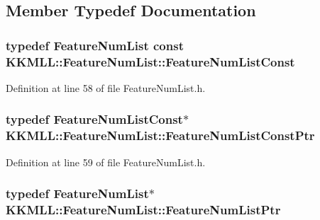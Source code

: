 \subsection{Member Typedef Documentation}
\subsubsection[{\texorpdfstring{Feature\+Num\+List\+Const}{FeatureNumListConst}}]{\setlength{\rightskip}{0pt plus 5cm}typedef {\bf Feature\+Num\+List} const {\bf K\+K\+M\+L\+L\+::\+Feature\+Num\+List\+::\+Feature\+Num\+List\+Const}}\hypertarget{class_k_k_m_l_l_1_1_feature_num_list_a2a39685c8a0cb219f57f9b256c92ed5c}{}\label{class_k_k_m_l_l_1_1_feature_num_list_a2a39685c8a0cb219f57f9b256c92ed5c}


Definition at line 58 of file Feature\+Num\+List.\+h.

\subsubsection[{\texorpdfstring{Feature\+Num\+List\+Const\+Ptr}{FeatureNumListConstPtr}}]{\setlength{\rightskip}{0pt plus 5cm}typedef {\bf Feature\+Num\+List\+Const}$\ast$ {\bf K\+K\+M\+L\+L\+::\+Feature\+Num\+List\+::\+Feature\+Num\+List\+Const\+Ptr}}\hypertarget{class_k_k_m_l_l_1_1_feature_num_list_acd650e72db80d861917402aad0a2cd32}{}\label{class_k_k_m_l_l_1_1_feature_num_list_acd650e72db80d861917402aad0a2cd32}


Definition at line 59 of file Feature\+Num\+List.\+h.

\subsubsection[{\texorpdfstring{Feature\+Num\+List\+Ptr}{FeatureNumListPtr}}]{\setlength{\rightskip}{0pt plus 5cm}typedef {\bf Feature\+Num\+List}$\ast$ {\bf K\+K\+M\+L\+L\+::\+Feature\+Num\+List\+::\+Feature\+Num\+List\+Ptr}}\hypertarget{class_k_k_m_l_l_1_1_feature_num_list_a8c7e53951a6f552a3f5e45c599ef05be}{}\label{class_k_k_m_l_l_1_1_feature_num_list_a8c7e53951a6f552a3f5e45c599ef05be}


